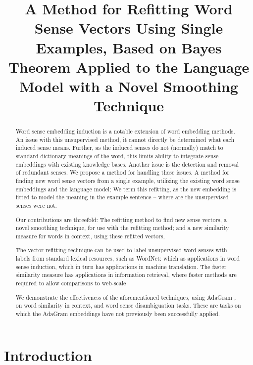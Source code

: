 \documentclass{sig-alternate}
\begin{document}
\title{A Method for Refitting Word Sense Vectors Using Single Examples, Based on Bayes Theorem Applied to the Language Model with a Novel Smoothing Technique}
\maketitle

\begin{abstract}
Word sense embedding induction is a  notable extension of word embedding methods.
An issue with this unsupervised method, it cannot directly be determined what each induced sense means.
Further, as the induced senses do not (normally) match to standard dictionary meanings of the word, this limits ability to integrate sense embeddings with existing knowledge bases. Another issue is the detection and removal of redundant senses.
We propose a method for handling these issues.
A method for finding new word sense vectors from a single example, utilizing the existing word sense embeddings and the language model;
We term this refitting, as the new embedding is fitted to model the meaning in the example sentence -- where are the unsupervised senses were not.

Our contributions are threefold:
The refitting method to find new sense vectors,
a novel smoothing technique, for use with the refitting method;
and a new similarity measure for words in context, using these refitted vectors,


The vector refitting technique can be used to label unsupervised word senses with labels from standard lexical resources, such as WordNet: which as applications in word sense induction, which in turn has applications in machine translation.
The faster similarity measure has applications in information retrieval, where faster methods are required to allow comparisons to web-scale


We demonstrate the effectiveness of the aforementioned techniques, using AdaGram \parencite{AdaGrams}, on word similarity in context, and word sense disambiguation tasks. These are tasks on which the AdaGram embeddings have not previously been successfully applied.
\end{abstract}

\section{Introduction}
\end{document}
